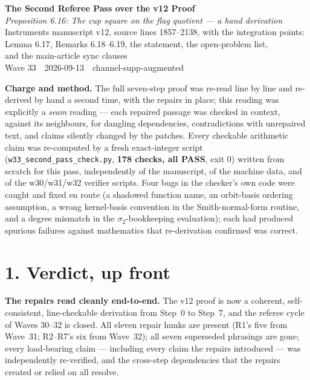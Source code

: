 \documentclass[11pt,a4paper]{article}
\begin{document}
\begin{center}
{\large\bfseries The Second Referee Pass over the v12 Proof}\\[4pt]
{\itshape Proposition 6.16: The cup square on the flag quotient --- a hand derivation}\\[6pt]
{\small Instruments manuscript v12, source lines 1857--2138, with the integration points:}\\
{\small Lemma 6.17, Remarks 6.18--6.19, the statement, the open-problem list,}\\
{\small and the main-article sync clauses}\\[6pt]
{\small Wave 33 \,\textbullet\, 2026-09-13 \,\textbullet\, channel-supp-augmented}
\end{center}
\vspace{4pt}

\noindent\textbf{Charge and method.} The full seven-step proof was re-read
line by line and re-derived by hand a second time, with the repairs in
place; this reading was explicitly a \emph{seam} reading --- each repaired
passage was checked in context, against its neighbours, for dangling
dependencies, contradictions with unrepaired text, and claims silently
changed by the patches. Every checkable arithmetic claim was re-computed by
a fresh exact-integer script (\texttt{w33\_second\_pass\_check.py},
\textbf{178 checks, all PASS}, exit 0) written from scratch for this pass,
independently of the manuscript, of the machine data, and of the
w30/w31/w32 verifier scripts. Four bugs in the checker's own code were
caught and fixed en route (a shadowed function name, an orbit-basis
ordering assumption, a wrong kernel-basis convention in the Smith-normal-form
routine, and a degree mismatch in the $\sigma_2$-bookkeeping evaluation);
each had produced spurious failures against mathematics that re-derivation
confirmed was correct.

\section*{1. Verdict, up front}

\textbf{The repairs read cleanly end-to-end.} The v12 proof is now a
coherent, self-consistent, line-checkable derivation from Step~0 to
Step~7, and the referee cycle of Waves 30--32 is closed. All eleven repair
hunks are present (R1's five from Wave~31; R2--R7's six from Wave~32);
all seven superseded phrasings are gone; every load-bearing claim ---
including every claim the repairs introduced --- was independently
re-verified, and the cross-step dependencies that the repairs created or
relied on all resolve.
\end{document}
